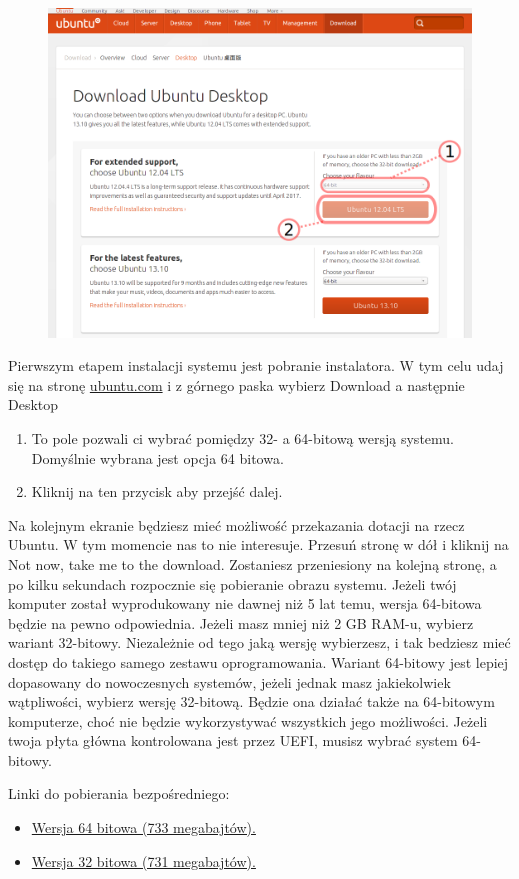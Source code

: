\begin{figure}
	\includegraphics[scale=0.45]{images/instalacja_pobieranie_obrazu.png}
\end{figure}
Pierwszym etapem instalacji systemu jest pobranie instalatora. W tym celu udaj się na stronę \href{http://www.ubuntu.com/download/desktop}{ubuntu.com} i z górnego paska wybierz \textcolor{ubuntu_orange}{Download} a następnie \textcolor{ubuntu_orange}{Desktop}
\begin{enumerate}
\item To pole pozwali ci wybrać pomiędzy 32- a 64-bitową wersją systemu. Domyślnie wybrana jest opcja 64 bitowa.
\item Kliknij na ten przycisk aby przejść dalej.
\end{enumerate}
Na kolejnym ekranie będziesz mieć możliwość przekazania dotacji na rzecz Ubuntu. W tym momencie nas to nie interesuje. Przesuń stronę w dół i kliknij na \textcolor{ubuntu_orange}{Not now, take me to the download}. Zostaniesz przeniesiony na kolejną stronę, a po kilku sekundach rozpocznie się pobieranie obrazu systemu.
Jeżeli twój komputer został wyprodukowany nie dawnej niż 5 lat temu, wersja 64-bitowa będzie na pewno odpowiednia. Jeżeli masz mniej niż 2 GB RAM-u, wybierz wariant 32-bitowy. Niezależnie od tego jaką wersję wybierzesz, i tak bedziesz mieć dostęp do takiego samego zestawu oprogramowania. Wariant 64-bitowy jest lepiej dopasowany do nowoczesnych systemów, jeżeli jednak masz jakiekolwiek wątpliwości, wybierz wersję 32-bitową. Będzie ona działać także na 64-bitowym komputerze, choć nie będzie wykorzystywać wszystkich jego możliwości.
Jeżeli twoja płyta główna kontrolowana jest przez UEFI, musisz wybrać system 64-bitowy.

Linki do pobierania bezpośredniego:
\begin{itemize}
\item \href{http://www.ubuntu.com/start-download?distro=desktop&bits=64&release=lts}{Wersja 64 bitowa (733 megabajtów).}
\item \href{http://www.ubuntu.com/start-download?distro=desktop&bits=32&release=lts}{Wersja 32 bitowa (731 megabajtów).}
\end{itemize}
\clearpage
